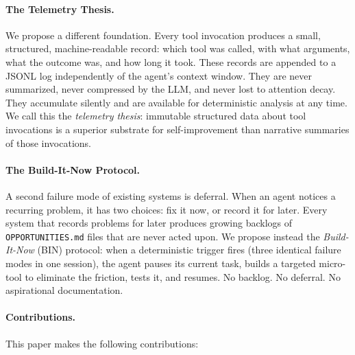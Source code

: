\paragraph{The Telemetry Thesis.}
We propose a different foundation. Every tool invocation produces a small,
structured, machine-readable record: which tool was called, with what arguments,
what the outcome was, and how long it took. These records are appended to a
JSONL log independently of the agent's context window. They are never
summarized, never compressed by the LLM, and never lost to attention decay.
They accumulate silently and are available for deterministic analysis at any
time. We call this the \emph{telemetry thesis}: immutable structured data about
tool invocations is a superior substrate for self-improvement than narrative
summaries of those invocations.

\paragraph{The Build-It-Now Protocol.}
A second failure mode of existing systems is deferral. When an agent notices a
recurring problem, it has two choices: fix it now, or record it for later. Every
system that records problems for later produces growing backlogs of
\texttt{OPPORTUNITIES.md} files that are never acted upon. We propose instead
the \emph{Build-It-Now} (BIN) protocol: when a deterministic trigger fires
(three identical failure modes in one session), the agent pauses its current
task, builds a targeted micro-tool to eliminate the friction, tests it, and
resumes. No backlog. No deferral. No aspirational documentation.

\paragraph{Contributions.}
This paper makes the following contributions:

